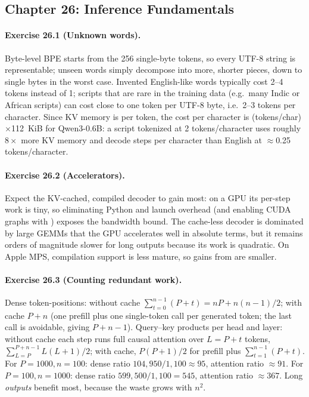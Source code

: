 \subsection*{Chapter 26: Inference Fundamentals}

\paragraph{Exercise 26.1 (Unknown words).}
Byte-level BPE starts from the 256 single-byte tokens, so every UTF-8 string is representable; unseen
words simply decompose into more, shorter pieces, down to single bytes in the worst case. Invented
English-like words typically cost 2--4 tokens instead of 1; scripts that are rare in the training data
(e.g.\ many Indic or African scripts) can cost close to one token per UTF-8 byte, i.e.\ 2--3 tokens per
character. Since KV memory is per token, the cost per character is (tokens/char)$\times$\SI{112}{KiB} for
Qwen3-0.6B: a script tokenized at 2 tokens/character uses roughly $8\times$ more KV memory and decode
steps per character than English at $\approx$0.25 tokens/character.

\paragraph{Exercise 26.2 (Accelerators).}
Expect the KV-cached, compiled decoder to gain most: on a GPU its per-step work is tiny, so eliminating
Python and launch overhead (and enabling CUDA graphs with ) exposes the bandwidth
bound. The cache-less decoder is dominated by large GEMMs that the GPU accelerates well in absolute terms,
but it remains orders of magnitude slower for long outputs because its work is quadratic. On Apple MPS,
compilation support is less mature, so gains from  are smaller.

\paragraph{Exercise 26.3 (Counting redundant work).}
Dense token-positions: without cache $\sum_{t=0}^{n-1}(P+t)=nP+n(n-1)/2$; with cache $P+n$ (one prefill plus
one single-token call per generated token; the last call is avoidable, giving $P+n-1$).
Query--key products per head and layer: without cache each step runs full causal attention over
$L=P+t$ tokens, $\sum_{L=P}^{P+n-1}L(L+1)/2$; with cache, $P(P+1)/2$ for prefill plus $\sum_{t=1}^{n-1}(P+t)$.
For $P=1000,n=100$: dense ratio $104{,}950/1{,}100\approx95$, attention ratio $\approx91$.
For $P=100,n=1000$: dense ratio $599{,}500/1{,}100=545$, attention ratio $\approx367$.
Long \emph{outputs} benefit most, because the waste grows with $n^2$.

